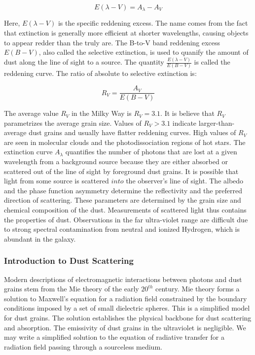 \documentclass[oneside]{book}
\theoremstyle{definition}
\numberwithin{equation}{section}
\begin{document}
\begin{equation}
E(\lambda-V)=A_{\lambda}-A_V
\end{equation}

Here, $E(\lambda-V)$ is the specific reddening excess. The name comes from the fact that extinction is generally more efficient at shorter wavelengths, causing objects to appear redder than the truly are. The B-to-V band reddening excess $E(B-V)$, also called the selective extinction, is used to quanify the amount of dust along the line of sight to a source. The quantity $\frac{E(\lambda-V)}{E(B-V)}$ is called the reddening curve. The ratio of absolute to selective extinction is:

\begin{equation}
R_V = \frac{A_V}{E(B-V)}
\end{equation}

The average value $R_V$ in the Milky Way is $R_V = 3.1$. It is believe that $R_V$ parametrizes the average grain size. Values of $R_V>3.1$ indicate larger-than-average dust grains and usually have flatter reddening curves. High values of $R_V$ are seen in molecular clouds and the photodissociation regions of hot stars. The extinction curve $A_{\lambda}$ quantifies the number of photons that are lost at a given wavelength from a background source because they are either absorbed or scattered out of the line of sight by foreground dust grains. It is possible that light from some source is scattered $into$ the observer's line of sight. The albedo and the phase function asymmetry determine the reflectivity and the preferred direction of scattering. These parameters are determined by the grain size and chemical composition of the dust. Measurements of scattered light thus contains the properties of dust. Observations in the far ultra-violet range are difficult due to strong spectral contamination from neutral and ionized Hydrogen, which is abundant in the galaxy. 

\subsubsection{Introduction to Dust Scattering}

Modern descriptions of electromagnetic interactions between photons and dust grains stem from the Mie theory of the early $20^{th}$ century. Mie theory forms a solution to Maxwell's equation for a radiation field constrained by the boundary conditions imposed by a set of small dielectric spheres. This is a simplified model for dust grains. The solution establishes the physical backbone for dust scattering and absorption. The emissivity of dust grains in the ultraviolet is negligible. We may write a simplified solution to the equation of radiative transfer for a radiation field passing through a sourceless medium.
\end{document}
